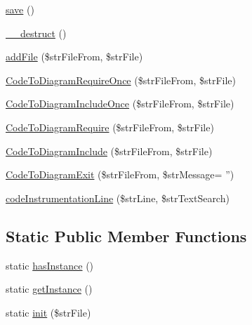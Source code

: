 \begin{CompactItemize}
\item 
\hyperlink{class_code_to_diagram_fc8a3c62679cf00ade9f15fb2a6d6132}{save} ()
\item 
\hyperlink{class_code_to_diagram_421831a265621325e1fdd19aace0c758}{\_\-\_\-destruct} ()
\item 
\hyperlink{class_code_to_diagram_5ddaedacfee2008cacee41a47363e7fa}{addFile} (\$strFileFrom, \$strFile)
\item 
\hyperlink{class_code_to_diagram_f51b27f0764b66ac0d52a47399286180}{CodeToDiagramRequireOnce} (\$strFileFrom, \$strFile)
\item 
\hyperlink{class_code_to_diagram_ebab1d697349f315022eeaf64c792172}{CodeToDiagramIncludeOnce} (\$strFileFrom, \$strFile)
\item 
\hyperlink{class_code_to_diagram_14610b43e210992a460d7eebbbe3c167}{CodeToDiagramRequire} (\$strFileFrom, \$strFile)
\item 
\hyperlink{class_code_to_diagram_cbf7ee26453936ec8211ff606f3ed6d3}{CodeToDiagramInclude} (\$strFileFrom, \$strFile)
\item 
\hyperlink{class_code_to_diagram_d18cd8b4121a7cb96ce7e89a88eef425}{CodeToDiagramExit} (\$strFileFrom, \$strMessage= '')
\item 
\hyperlink{class_code_to_diagram_2d9bbf465fc0ace643bef01690a3336a}{codeInstrumentationLine} (\$strLine, \$strTextSearch)
\end{CompactItemize}
\subsection*{Static Public Member Functions}
\begin{CompactItemize}
\item 
static \hyperlink{class_code_to_diagram_abea252aaf2bf265677fdc29ed4e3fa1}{hasInstance} ()
\item 
static \hyperlink{class_code_to_diagram_c93fbec81f07e5d15f80db907e63dc10}{getInstance} ()
\item 
static \hyperlink{class_code_to_diagram_f20af03286d73d30d03d593cc88babd9}{init} (\$strFile)
\end{CompactItemize}
